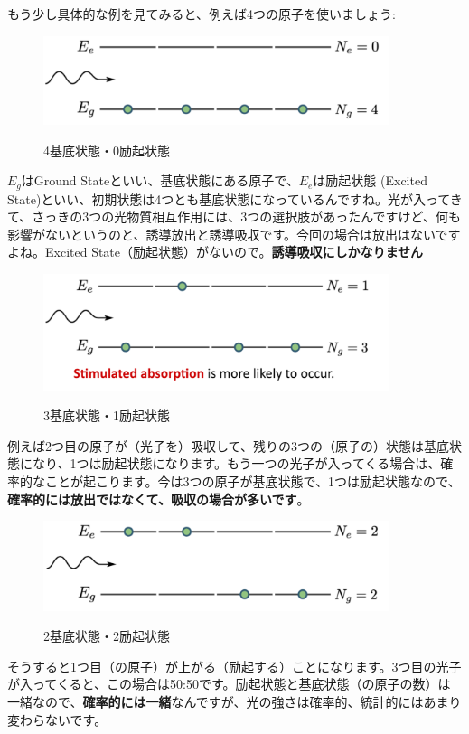 もう少し具体的な例を見てみると、例えば4つの原子を使いましょう:
\begin{figure}[H]
    \centering
    \includegraphics[width=0.9\textwidth]{lesson5/4_ground.pdf}
    \label{図: 1}
    \caption{4基底状態・0励起状態}
\end{figure}
$E_g$はGround Stateといい、基底状態にある原子で、$E_e$は励起状態  (Excited State)といい、初期状態は4つとも基底状態になっているんですね。光が入ってきて、さっきの3つの光物質相互作用には、3つの選択肢があったんですけど、何も影響がないというのと、誘導放出と誘導吸収です。今回の場合は放出はないですよね。Excited State（励起状態）がないので。\textbf{誘導吸収にしかなりません}
\begin{figure}[H]
    \centering
    \includegraphics[width=0.9\textwidth]{lesson5/3_ground_1_excited.pdf}
    \label{図: 1}
    \caption{3基底状態・1励起状態}
\end{figure}
例えば2つ目の原子が（光子を）吸収して、残りの3つの（原子の）状態は基底状態になり、1つは励起状態になります。もう一つの光子が入ってくる場合は、確率的なことが起こります。今は3つの原子が基底状態で、1つは励起状態なので、\textbf{確率的には放出ではなくて、吸収の場合が多いです}。
\begin{figure}[H]
    \centering
    \includegraphics[width=0.9\textwidth]{lesson5/2_ground_2_excited.pdf}
    \label{図: 1}
    \caption{2基底状態・2励起状態}
\end{figure}
そうすると1つ目（の原子）が上がる（励起する）ことになります。3つ目の光子が入ってくると、この場合は50:50です。励起状態と基底状態（の原子の数）は一緒なので、\textbf{確率的には一緒}なんですが、光の強さは確率的、統計的にはあまり変わらないです。

